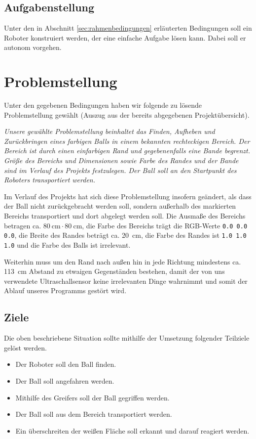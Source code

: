 \documentclass{fetch-my-doc}
\begin{document}
    \subsection{Aufgabenstellung}
      Unter den in Abschnitt \ref{sec:rahmenbedingungen} erläuterten Bedingungen soll ein Roboter konstruiert werden, der eine einfache Aufgabe lösen kann. Dabei soll er autonom vorgehen.
      
    
  \section{Problemstellung}
    Unter den gegebenen Bedingungen haben wir folgende zu lösende Problemstellung gewählt (Auszug aus der bereits abgegebenen Projektübersicht).
    
    \glqq\textit{Unsere gewählte Problemstellung beinhaltet das Finden, Aufheben und Zurückbringen eines farbigen Balls in einem bekannten rechteckigen Bereich. Der Bereich ist durch einen einfarbigen Rand und gegebenenfalls eine Bande begrenzt. Größe des Bereichs und Dimensionen sowie Farbe des Randes und der Bande sind im Verlauf des Projekts festzulegen. Der Ball soll an den Startpunkt des Roboters transportiert werden.}\grqq
    
    Im Verlauf des Projekts hat sich diese Problemstellung insofern geändert, als dass der Ball nicht zurückgebracht werden soll, sondern außerhalb des markierten Bereichs transportiert und dort abgelegt werden soll. Die Ausmaße des Bereichs betragen ca. $\SI{80}{\centi\meter} \cdot \SI{80}{\centi\meter}$, die Farbe des Bereichs trägt die RGB-Werte \verb+0.0 0.0 0.0+, die Breite des Randes beträgt ca. \SI{20}{\centi\meter}, die Farbe des Randes ist \verb+1.0 1.0 1.0+ und die Farbe des Balls ist irrelevant.
    
    Weiterhin muss um den Rand nach außen hin in jede Richtung mindestens ca. \SI{113}{\centi\meter} Abstand zu etwaigen Gegenständen bestehen, damit der von uns verwendete Ultraschallsensor keine irrelevanten Dinge wahrnimmt und somit der Ablauf unseres Programms gestört wird.
  
    \subsection{Ziele}
    
    Die oben beschriebene Situation sollte mithilfe der Umsetzung folgender Teilziele gelöst werden. 
    
      \begin{itemize}
        \item Der Roboter soll den Ball finden.
        \item Der Ball soll angefahren werden.
        \item Mithilfe des Greifers soll der Ball gegriffen werden.
        \item Der Ball soll aus dem Bereich transportiert werden.
        \item Ein überschreiten der weißen Fläche soll erkannt und darauf reagiert werden.
      \end{itemize}
      
\end{document}
